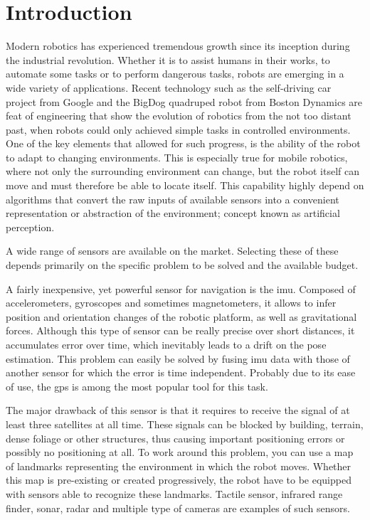 \chapter*{Introduction} 

Modern robotics has experienced tremendous growth since its inception during the industrial revolution. Whether it is to assist humans in their works, to automate some tasks or to perform dangerous tasks, robots are emerging in a wide variety of applications. Recent technology such as the self-driving car project from Google and the BigDog quadruped robot from Boston Dynamics are feat of engineering that show the evolution of robotics from the not too distant past, when robots could only achieved simple tasks in controlled environments. One of the key elements that allowed for such progress, is the ability of the robot to adapt to changing environments. This is especially true for mobile robotics, where not only the surrounding environment can change, but the robot itself can move and must therefore be able to locate itself. This capability highly depend on algorithms that convert the raw inputs of available sensors into a convenient representation or abstraction of the environment; concept known as artificial perception.

A wide range of sensors are available on the market. Selecting these of these depends primarily on the specific problem to be solved and the available budget. 

A fairly inexpensive, yet powerful sensor for navigation is the \gls*{imu}. Composed of accelerometers, gyroscopes and sometimes magnetometers, it allows to infer position and orientation changes of the robotic platform, as well as gravitational forces. Although this type of sensor can be really precise over short distances, it accumulates error over time, which inevitably leads to a drift on the pose estimation. This problem can easily be solved by fusing \gls*{imu} data with those of another sensor for which the error is time independent. Probably due to its ease of use, the \gls*{gps} is among the most popular tool for this task. 

The major drawback of this sensor is that it requires to receive the signal of at least three satellites at all time. These signals can be blocked by building, terrain, dense foliage or other structures, thus causing important positioning errors or possibly no positioning at all. To work around this problem, you can use a map of landmarks representing the environment in which the robot moves. Whether this map is pre-existing or created progressively, the robot have to be equipped with sensors able to recognize these landmarks. Tactile sensor, infrared range finder, \gls*{sonar}, \gls*{radar} and multiple type of cameras are examples of such sensors.

